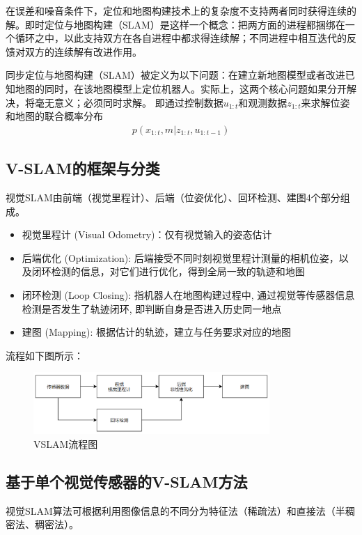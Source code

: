 \documentclass[cs4size,a4paper]{ctexart}
\numberwithin{equation}{section}
\numberwithin{table}{section}
\numberwithin{figure}{section}
\begin{document}
在误差和噪音条件下，定位和地图构建技术上的复杂度不支持两者同时获得连续的解。即时定位与地图构建（SLAM）是这样一个概念：把两方面的进程都捆绑在一个循环之中，以此支持双方在各自进程中都求得连续解；不同进程中相互迭代的反馈对双方的连续解有改进作用。

同步定位与地图构建（SLAM）被定义为以下问题：在建立新地图模型或者改进已知地图的同时，在该地图模型上定位机器人。实际上，这两个核心问题如果分开解决，将毫无意义；必须同时求解。
即通过控制数据$u_{1:t}$和观测数据$z_{1:t}$来求解位姿和地图的联合概率分布
\begin{align}
    p\left(x_{1: t}, m | z_{1: t}, u_{1: t-1}\right)
\end{align}

\subsection{V-SLAM的框架与分类}
视觉SLAM由前端（视觉里程计）、后端（位姿优化）、回环检测、建图4个部分组成。
\begin{itemize}
        \item  视觉里程计 (Visual Odometry)：仅有视觉输入的姿态估计\cite{1315094}
        \item 后端优化 (Optimization): 后端接受不同时刻视觉里程计测量的相机位姿，以及闭环检测的信息，对它们进行优化，得到全局一致的轨迹和地图\cite{9787121311048}
        \item 闭环检测 (Loop Closing): 指机器人在地图构建过程中, 通过视觉等传感器信息检测是否发生了轨迹闭环, 即判断自身是否进入历史同一地点\cite{9787121311048}
        \item  建图 (Mapping): 根据估计的轨迹，建立与任务要求对应的地图\cite{9787121311048}
\end{itemize}
流程如下图所示：

    \begin{figure}[H]
        \centering
        \includegraphics[width=0.8\textwidth]{figure/framework.png}
        \caption{VSLAM流程图\cite{9787121311048}}
    \end{figure}
    
\subsection{基于单个视觉传感器的V-SLAM方法}
视觉SLAM算法可根据利用图像信息的不同分为特征法（稀疏法）和直接法（半稠密法、稠密法）。
\end{document}
